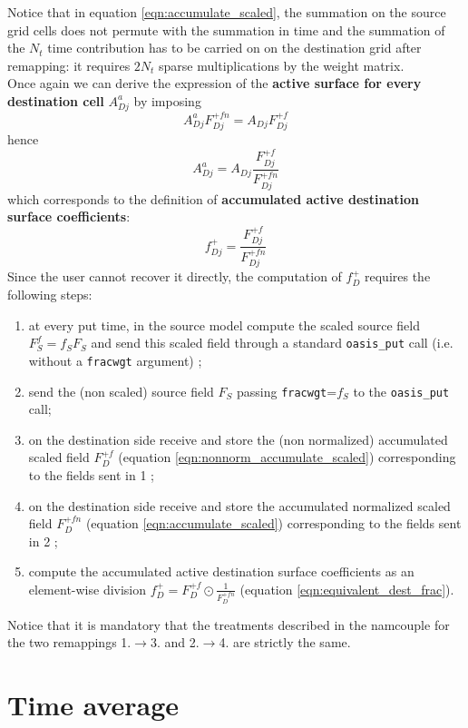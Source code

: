 Notice that in equation \ref{eqn:accumulate_scaled}, the summation on the source grid cells does not permute with the summation in time and the summation of the \(N_{t}\) time contribution has to be carried on on the destination grid after remapping: it requires \(2N_t\) sparse multiplications by the weight matrix.\\
Once again we can derive the expression of the {\bf active surface for every destination cell} \(A^a_{Dj}\) by imposing
\[A^a_{Dj}F^{+fn}_{Dj}=A_{Dj}F^{+f}_{Dj}\]
hence
\begin{equation}
    A^a_{Dj}=A_{Dj}\frac{F^{+f}_{Dj}}{F^{+fn}_{Dj}}
\end{equation}
which corresponds to the definition of {\bf accumulated active destination surface coefficients}:
\begin{equation}\label{eqn:equivalent_dest_frac}
f^+_{Dj} = \frac{F^{+f}_{Dj}}{F^{+fn}_{Dj}}  
\end{equation}
Since the user cannot recover it directly, the computation of \(f^+_D\) requires the following steps:
\begin{enumerate}
    \item at every put time, in the source model compute the scaled source field \(F^f_S = f_SF_S\) and send this scaled field through a standard {\tt oasis\_put} call (i.e. without a {\tt fracwgt} argument) ;
    \item send the (non scaled) source field \(F_S\) passing {\tt fracwgt}=\(f_S\) to the  {\tt oasis\_put} call;
    \item on the destination side receive and store the (non normalized) accumulated scaled field \(F^{+f}_D\) (equation \ref{eqn:nonnorm_accumulate_scaled}) corresponding to the fields sent in 1 ;
    \item on the destination side receive and store the accumulated normalized scaled field \(F^{+fn}_D\) (equation \ref{eqn:accumulate_scaled}) corresponding to the fields sent in 2 ;
    \item compute the accumulated active destination surface coefficients as an element-wise division \(f^{+}_D = F^{+f}_D \odot \frac{1}{F^{+fn}_D}\) (equation \ref{eqn:equivalent_dest_frac}).
\end{enumerate}
Notice that it is mandatory that the treatments described in the namcouple for the two remappings 1.\(\rightarrow\)3. and 2.\(\rightarrow\)4. are strictly the same.

\section {Time average}


